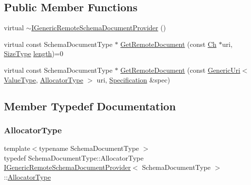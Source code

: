 \subsection*{Public Member Functions}
\begin{DoxyCompactItemize}
\item 
virtual \hyperlink{classIGenericRemoteSchemaDocumentProvider_a8465954888b127a2ef966ed01c3692bb}{$\sim$\+I\+Generic\+Remote\+Schema\+Document\+Provider} ()
\item 
virtual const Schema\+Document\+Type $\ast$ \hyperlink{classIGenericRemoteSchemaDocumentProvider_aad112a069dd57fe850fafd04cbb4777b}{Get\+Remote\+Document} (const \hyperlink{classIGenericRemoteSchemaDocumentProvider_acfcd5492c3df8ff56cd2d84d36cc0ceb}{Ch} $\ast$uri, \hyperlink{rapidjson_8h_a5ed6e6e67250fadbd041127e6386dcb5}{Size\+Type} \hyperlink{imgui__impl__opengl3__loader_8h_a011fc24f10426c01349e94a4edd4b0d5}{length})=0
\item 
virtual const Schema\+Document\+Type $\ast$ \hyperlink{classIGenericRemoteSchemaDocumentProvider_a71b8b9eda5b5009df44fffdce0a3eb6f}{Get\+Remote\+Document} (const \hyperlink{classGenericUri}{Generic\+Uri}$<$ \hyperlink{classIGenericRemoteSchemaDocumentProvider_aefaefd0d3fc938b6a81634edf1646205}{Value\+Type}, \hyperlink{classIGenericRemoteSchemaDocumentProvider_a79476f0e0f4d51ca7244685698dadbd0}{Allocator\+Type} $>$ uri, \hyperlink{structSpecification}{Specification} \&spec)
\end{DoxyCompactItemize}


\subsection{Member Typedef Documentation}
\mbox{\label{classIGenericRemoteSchemaDocumentProvider_a79476f0e0f4d51ca7244685698dadbd0}} 
\subsubsection{\texorpdfstring{Allocator\+Type}{AllocatorType}}
{\footnotesize\ttfamily template$<$typename Schema\+Document\+Type $>$ \\
typedef Schema\+Document\+Type\+::\+Allocator\+Type \hyperlink{classIGenericRemoteSchemaDocumentProvider}{I\+Generic\+Remote\+Schema\+Document\+Provider}$<$ Schema\+Document\+Type $>$\+::\hyperlink{classIGenericRemoteSchemaDocumentProvider_a79476f0e0f4d51ca7244685698dadbd0}{Allocator\+Type}}

